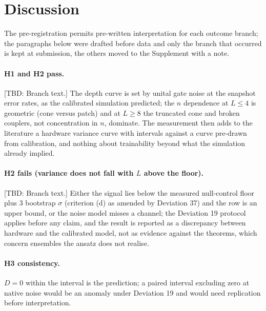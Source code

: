\documentclass[aps,prxquantum,reprint,superscriptaddress,nofootinbib,longbibliography,amsmath,amssymb]{revtex4-2}
\newcommand{\tbd}[1]{\textcolor{orange!80!black}{[TBD: #1]}}
\begin{document}
\section{Discussion}\label{sec:discussion}
The pre-registration permits pre-written interpretation for each outcome branch; the paragraphs below were drafted before data and only the branch that occurred is kept at submission, the others moved to the Supplement with a note.

\paragraph{H1 and H2 pass.} \tbd{Branch text.} The depth curve is set by unital gate noise at the snapshot error rates, as the calibrated simulation predicted; the $n$ dependence at $L \leq 4$ is geometric (cone versus patch) and at $L \geq 8$ the truncated cone and broken couplers, not concentration in $n$, dominate. The measurement then adds to the literature a hardware variance curve with intervals against a curve pre-drawn from calibration, and nothing about trainability beyond what the simulation already implied.

\paragraph{H2 fails (variance does not fall with $L$ above the floor).} \tbd{Branch text.} Either the signal lies below the measured null-control floor plus 3 bootstrap $\sigma$ (criterion (d) as amended by Deviation 37) and the row is an upper bound, or the noise model misses a channel; the Deviation 19 protocol applies before any claim, and the result is reported as a discrepancy between hardware and the calibrated model, not as evidence against the theorems, which concern ensembles the ansatz does not realise.

\paragraph{H3 consistency.} $D = 0$ within the interval is the prediction; a paired interval excluding zero at native noise would be an anomaly under Deviation 19 and would need replication before interpretation.
\end{document}

